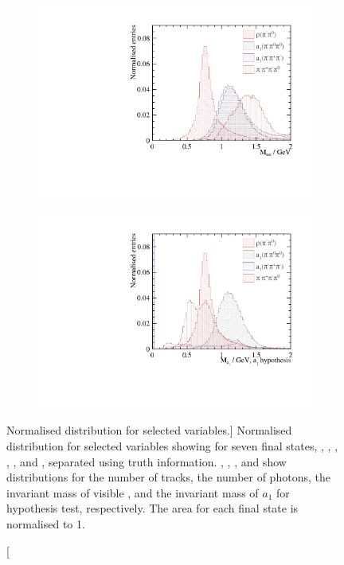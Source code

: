 \begin{figure}[htbp]
\begin{subfigure}[b]{0.45\textwidth}
 \includegraphics[width=\textwidth]{tau/var2/mVis_100GeV_improved_zoom.pdf}
  \caption{}
  \label{fig:tauVarMVis}
\end{subfigure}
\begin{subfigure}[b]{0.45\textwidth}
 \includegraphics[width=\textwidth]{tau/var2/mA1A1Fit_100GeV_improved_zoom.pdf}
  \caption{}
  \label{fig:tauVarMA1}
\end{subfigure}

\caption
[Normalised distribution for selected variables.]
{
Normalised distribution for selected variables showing for seven final states, \decayElectronShort, \decayMuonShort, \decayPionShort, \decayRhoShort, \decayAiPhotonShort, \decayAiPionShort and \decayThreePionPhotonShort, separated using truth information. , , , and  show distributions for the number of tracks, the number of photons, the invariant mass of visible \PFOs, and the invariant mass of $a_1$ for \decayAiPhotonShort hypothesis test, respectively. The area for each final state is normalised to 1.
}
\label{fig:tauVar}
\end{figure}

